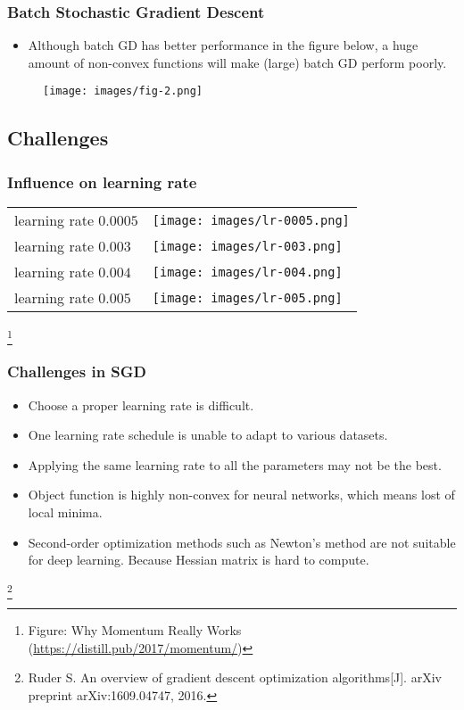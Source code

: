 \documentclass[10pt]{beamer}
\theoremstyle{mystyle}
\newcommand\blfootnote[1]{%
  \begingroup
  \renewcommand\thefootnote{}\footnote[frame]{#1}%
  \addtocounter{footnote}{-1}%
  \endgroup
}
\theoremstyle{mystyle}
\begin{document}
\begin{frame}
	\frametitle{Batch Stochastic Gradient Descent}
	\begin{itemize}
		\item Although batch GD has better performance in the figure below, a huge amount of non-convex functions will make (large) batch GD perform poorly.
	\end{itemize}
	\begin{figure}[H]
		\centering
		\texttt{[image: images/fig-2.png]}
	\end{figure}
\end{frame}

\subsection{Challenges}
\begin{frame}
	\frametitle{Influence on learning rate}
	\centering
		\begin{tabular}{m{4cm} m{12cm}}
			learning rate $0.0005$ &
			\texttt{[image: images/lr-0005.png]} \\
			learning rate $0.003$ &
			\texttt{[image: images/lr-003.png]} \\
			learning rate $0.004$ &
			\texttt{[image: images/lr-004.png]} \\
			learning rate $0.005$ &
			\texttt{[image: images/lr-005.png]} \\
		\end{tabular}
	\blfootnote{Figure: Why Momentum Really Works (\url{https://distill.pub/2017/momentum/})}
\end{frame}

\begin{frame}
	\frametitle{Challenges in SGD}
	\begin{itemize}
		\item Choose a proper learning rate is difficult.
		\item One learning rate schedule is unable to adapt to various datasets.
		\item Applying the same learning rate to all the parameters may not be the best.
		\item Object function is highly non-convex for neural networks, which means lost of local minima.
		\item Second-order optimization methods such as Newton's method are not suitable for deep learning. Because Hessian matrix is hard to compute.
	\end{itemize}
	\blfootnote{Ruder S. An overview of gradient descent optimization algorithms[J]. arXiv preprint arXiv:1609.04747, 2016.}
\end{frame}
\end{document}
